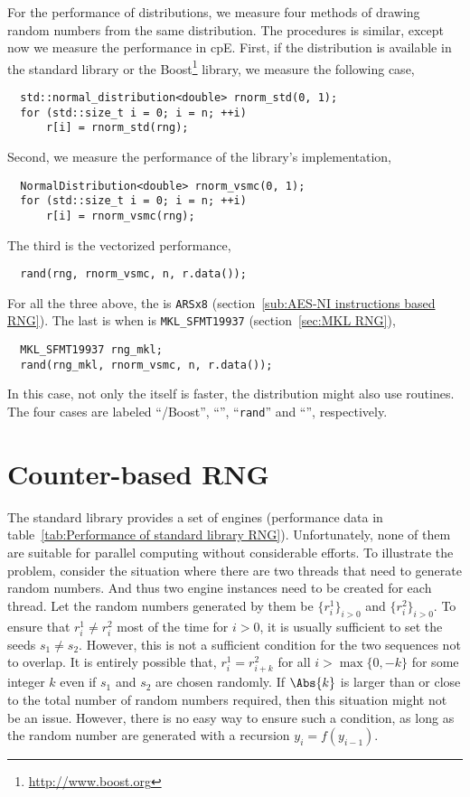 For the performance of distributions, we measure four methods of drawing random
numbers from the same distribution. The procedures is similar, except now we
measure the performance in cpE. First, if the distribution is available in the
standard library or the Boost\footnote{\url{http://www.boost.org}} library, we
measure the following case,
\begin{Verbatim}
  std::normal_distribution<double> rnorm_std(0, 1);
  for (std::size_t i = 0; i = n; ++i)
      r[i] = rnorm_std(rng);
\end{Verbatim}
Second, we measure the performance of the library's implementation,
\begin{Verbatim}
  NormalDistribution<double> rnorm_vsmc(0, 1);
  for (std::size_t i = 0; i = n; ++i)
      r[i] = rnorm_vsmc(rng);
\end{Verbatim}
The third is the vectorized performance,
\begin{Verbatim}
  rand(rng, rnorm_vsmc, n, r.data());
\end{Verbatim}
For all the three above, the \rng is \verb|ARSx8| (section~\ref{sub:AES-NI
  instructions based RNG}). The last is when \rng is \verb|MKL_SFMT19937|
(section~\ref{sec:MKL RNG}),
\begin{Verbatim}
  MKL_SFMT19937 rng_mkl;
  rand(rng_mkl, rnorm_vsmc, n, r.data());
\end{Verbatim}
In this case, not only the \rng itself is faster, the distribution might also
use \mkl routines. The four cases are labeled ``\std/Boost'', ``\vsmc'',
``\verb|rand|'' and ``\mkl'', respectively.

\section{Counter-based RNG}
\label{sec:Counter-based RNG}

The standard library provides a set of \rng engines (performance data in
table~\ref{tab:Performance of standard library RNG}). Unfortunately, none of
them are suitable for parallel computing without considerable efforts. To
illustrate the problem, consider the situation where there are two threads that
need to generate random numbers. And thus two \rng engine instances need to be
created for each thread. Let the random numbers generated by them be
$\{r_i^1\}_{i>0}$ and $\{r_i^2\}_{i>0}$. To ensure that $r_i^1 \ne
r_i^2$ most of the time for $i > 0$, it is usually sufficient to set the
seeds $s_1 \ne s_2$. However, this is not a sufficient condition for the two
sequences not to overlap. It is entirely possible that, $r_i^1 = r_{i + k}^2$
for all $i > \max\{0, -k\}$ for some integer $k$ even if $s_1$ and $s_2$ are
chosen randomly. If $\Abs{k}$ is larger than or close to the total number of
random numbers required, then this situation might not be an issue. However,
there is no easy way to ensure such a condition, as long as the random number
are generated with a recursion $y_i = f(y_{i - 1})$.

